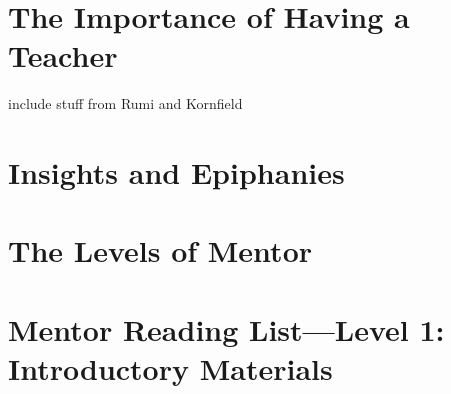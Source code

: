 \section{The Importance of Having a Teacher}

include stuff from Rumi and Kornfield

\section{Insights and Epiphanies}

\section{The Levels of Mentor}



\section{Mentor Reading List---Level 1: Introductory Materials}


